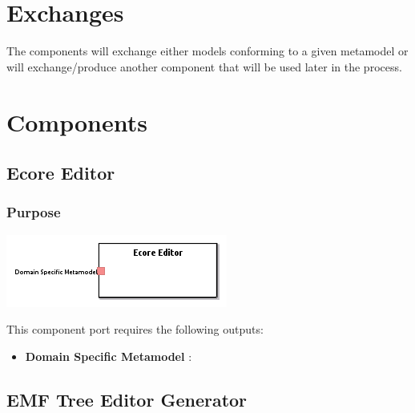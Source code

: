 \documentclass{gemoc} %
\begin{document}
\section{Exchanges}
The components will exchange either models conforming to a given metamodel or will exchange/produce another component that will be used later in the process.


\section{Components}

\subsection{Ecore Editor}


\subsubsection{Purpose}

\begin{center}
\includegraphics*[trim=0.0cm 0.0cm 0cm 0.0cm, clip=true]{../images/generated/Generated_Ecore_Editor.png}
\end{center}


This component port requires the following outputs:
\begin{itemize}
  \item \textbf{Domain Specific Metamodel} :
\end{itemize}

\subsection{EMF Tree Editor Generator}

\end{document}
